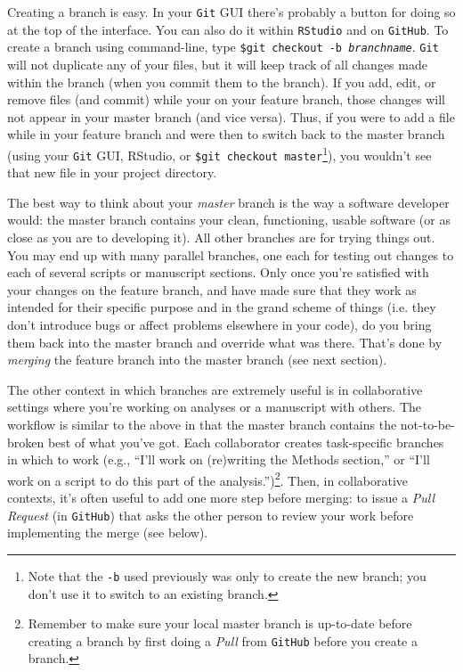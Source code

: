 \documentclass[12pt,letterpaper]{article}
\begin{document}
Creating a branch is easy.
In your \texttt{Git} GUI there's probably a button for doing so at the top of 
the interface.
You can also do it within \texttt{RStudio} and on \texttt{GitHub}.
To create a branch using command-line, type \texttt{\$git checkout -b \emph{branchname}}.
\texttt{Git} will not duplicate any of your files, but it will keep track of all changes made within the branch (when you commit them to the branch).
If you add, edit, or remove files (and commit) while your on your feature branch, those changes will not appear in your master branch (and vice versa).
Thus, if you were to add a file while in your feature branch and were then to 
switch back to the master branch (using your \texttt{Git} GUI, RStudio, or 
\texttt{\$git checkout master}\footnote{Note that the \texttt{-b} used previously 
was only to create the new branch; you don't use it to switch to an existing 
branch.}), you wouldn't see that new file in your project directory.

The best way to think about your \emph{master} branch is the way a software developer would:
the master branch contains your clean, functioning, usable software (or as close as you are to developing it).
All other branches are for trying things out.
You may end up with many parallel branches, one each for testing out changes to each of several scripts or manuscript sections.
Only once you're satisfied with your changes on the feature branch, and have made sure that they work as intended for their specific purpose and in the grand scheme of things (i.e. they don't introduce bugs or affect problems elsewhere in your code), do you bring them back into the master branch and override what was there.
That's done by \emph{merging} the feature branch into the master branch (see next section).

The other context in which branches are extremely useful is in collaborative settings where you're working on analyses or a manuscript with others.
The workflow is similar to the above in that the master branch contains the not-to-be-broken best of what you've got.
Each collaborator creates task-specific branches in which to work (e.g., ``I'll work on (re)writing the Methods section,'' or ``I'll work on a script to do this part of the analysis.'')\footnote{Remember to make sure your local master branch is up-to-date before creating a branch by first doing a \emph{Pull} from \texttt{GitHub} before you create a branch.}.
Then, in collaborative contexts, it's often useful to add one more step before merging:  to issue a \emph{Pull Request} (in \texttt{GitHub}) that asks the other person to review your work before implementing the merge (see below).
\end{document}
